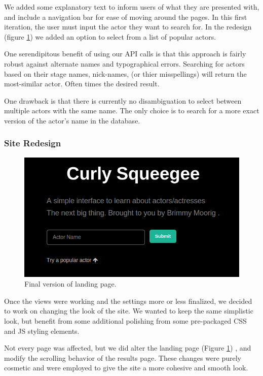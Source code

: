 \documentclass[12pt]{article}
\begin{document}
 


We added some explanatory text to inform users of what they are presented with, and include a navigation bar for ease of moving around the pages. In this first iteration, the user must input the actor they want to search for.  In the redesign (figure \ref{blackLandingPage}) we added an option to select from a list of popular actors.

One serendipitous benefit of using our API calls is that this approach is fairly robust against alternate names and typographical errors.  Searching for actors based on their stage names, nick-names, (or thier misspellings) will return the most-similar actor. Often times the desired result.  

One drawback is that there is currently no disambiguation to select between multiple actors with the same name.  The only choice is to search for a more exact version of the actor's name in the database.

\subsubsection{Site Redesign}


\begin{figure}
\centering
\includegraphics[scale=0.3]{images/landingBoxFinal.png}
\caption{Final version of landing page.}\label{blackLandingPage}
\end{figure}


Once the views were working and the settings more or less finalized, we decided to work on changing the look of the site.  We wanted to keep the same simplistic look, but benefit from some additional polishing from some pre-packaged CSS and JS styling elements. 

Not every page was affected, but we did alter the landing page (Figure \ref{blackLandingPage}) , and modify the scrolling behavior of the results page.  These changes were purely cosmetic and were employed to give the site a more cohesive and smooth look.
\end{document}
